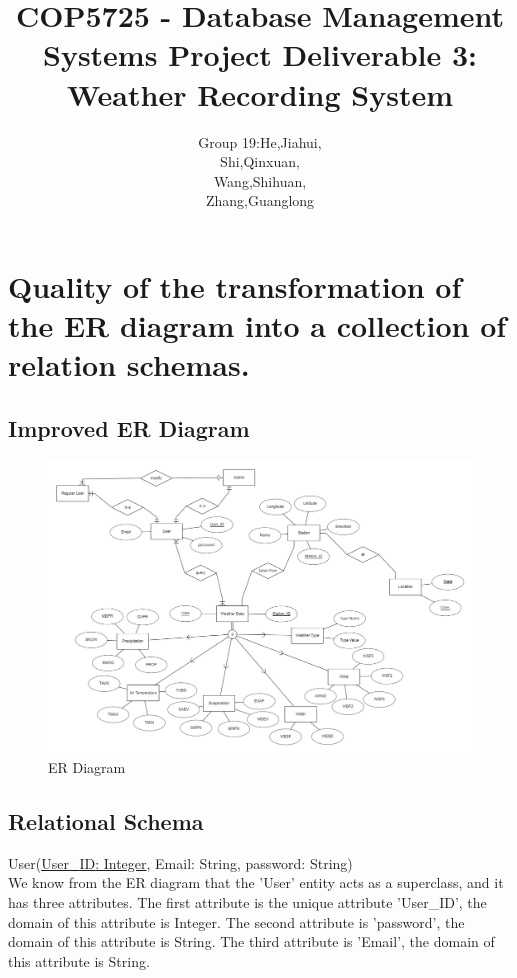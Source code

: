 \documentclass[]{article}
\title{\Huge COP5725 - Database Management Systems\vspace{2.8em} \LARGE \textbf{Project Deliverable 3:} Weather Recording System}
\author{
	\Large Group 19:\qquad He,Jiahui,\\
	\Large \qquad\qquad\qquad\qquad Shi,Qinxuan,\\
	\Large \qquad\qquad\qquad\qquad Wang,Shihuan,\\
	\Large \qquad\qquad\qquad\qquad\qquad Zhang,Guanglong
}
\date{}
\begin{document}
	
	\maketitle
	\clearpage
	
	\tableofcontents
	\clearpage
	
	\section{Quality of the transformation of the ER diagram into a collection of relation schemas.}
	
	\subsection{Improved ER Diagram}
	
	\begin{figure}[H]
		\centering
		\includegraphics[width=1\linewidth]{../d3-p/ER}
		\caption{ER Diagram}
		\label{fig:er}
	\end{figure}
	
	\subsection{Relational Schema}
	
	\noindent User(\uline{User\_{ID}: Integer}, Email: String, password: String) \\
	
	\noindent We know from the ER diagram that the 'User' entity acts as a superclass, and it has three attributes. The first attribute is the unique attribute 'User\_ID', the domain of this attribute is Integer. The second attribute is 'password', the domain of this attribute is String. The third attribute is 'Email', the domain of this attribute is String.  \\
	
\end{document}
